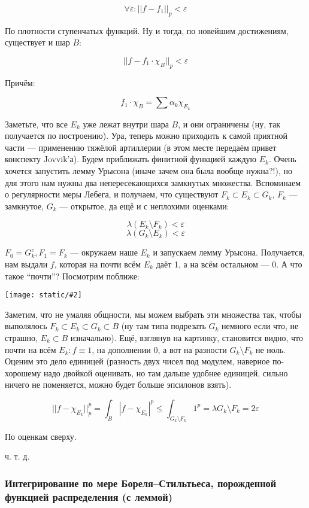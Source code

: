 \documentclass{article}
\def\images#1#2{\begin{center}\texttt{[image: static/\#2]}\end{center}}
\begin{document}
\[\forall \varepsilon: ||f - f_1||_p < \varepsilon\]

По плотности ступенчатых функций. Ну и тогда, по новейшим достижениям, существует и шар $B$:

\[||f - f_1 \cdot \chi_{B}||_p < \varepsilon\]

Причём:

\[f_1 \cdot \chi_{B} = \sum \alpha_k \chi_{E_k}\]

Заметьте, что все $E_k$ уже лежат внутри шара $B$, и они ограничены (ну, так получается по построению). Ура, теперь можно приходить к самой приятной части --- применению тяжёлой артиллерии (в этом месте передаём привет конспекту Jovvik'а). Будем приближать финитной функцией каждую $E_k$. Очень хочется запустить лемму Урысона (иначе зачем она была вообще нужна?!), но для этого нам нужны два непересекающихся замкнутых множества. Вспоминаем о регулярности меры Лебега, и получаем, что существуют $F_k \subset E_k \subset G_k$, $F_k$ --- замкнутое, $G_k$ --- открытое, да ещё и с неплохими оценками:

\[\lambda (E_k \setminus F_k) < \varepsilon\]
\[\lambda (G_k \setminus E_k) < \varepsilon\]

$F_0 = G_k^c, F_1 = F_k$ --- окружаем наше $E_k$ и запускаем лемму Урысона. Получается, нам выдали $f$, которая на почти всём $E_k$ даёт 1, а на всём остальном --- 0. А что такое ``почти''? Посмотрим поближе:

\images{0.3}{pl_fin.jpg}

Заметим, что не умаляя общности, мы можем выбрать эти множества так, чтобы выполялось $F_k \subset E_k \subset G_k \subset B$ (ну там типа подрезать $G_k$ немного если что, не страшно, $E_k \subset B$ изначально). Ещё, взглянув на картинку, становится видно, что почти на всём $E_k: f \equiv 1$, на дополнении 0, а вот на разности $G_k \setminus F_k$ не ноль. Оценим это дело единицей (разность двух чисел под модулем, наверное по-хорошему надо двойкой оценивать, но там дальше удобнее единицей, сильно ничего не поменяется, можно будет больше эпсилонов взять).

\[||f - \chi_{E_k}||_p^p = \int_{B} |f - \chi_{E_k}|^p \le \int_{G_k \setminus F_k} 1^p = \lambda G_k \setminus F_k = 2 \varepsilon\]

По оценкам сверху.

ч. т. д. 

\subsubsection{Интегрирование по мере Бореля--Стильтьеса, порожденной функцией распределения (с леммой)}
\end{document}
